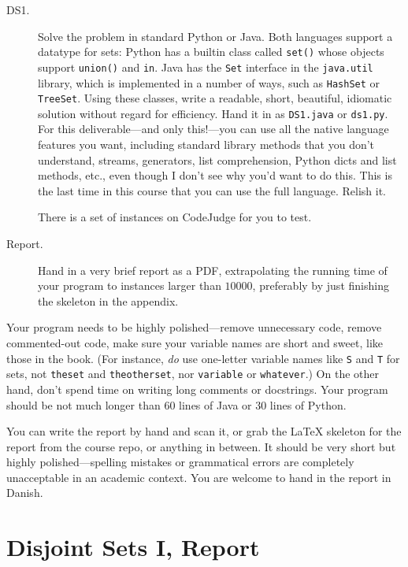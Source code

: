 \documentclass{tufte-handout}
\begin{document}
\begin{description}
  \item[DS1.]
    Solve the problem in standard Python or Java.
    Both languages support a datatype for sets:
    Python has a builtin class called \texttt{set()} whose objects support \texttt{union()} and \texttt{in}.
    Java has the \texttt{Set} interface in the \texttt{java.util} library, which is implemented in a number of ways, such as \texttt{HashSet} or \texttt{TreeSet}.
    Using these classes, write a readable, short, beautiful, idiomatic solution without regard for efficiency.
    Hand it in as \texttt{DS1.java} or \texttt{ds1.py}.
    For this deliverable---and only this!---you can use all the native language features you want, including standard library methods that you don't understand, streams, generators, list comprehension, Python dicts and list methods, etc., even though I don't see why you'd want to do this.
    This is the last time in this course that you can use the full language.
    Relish it.
    
    There is a set of instances on CodeJudge for you to test.
  \item[Report.]
    Hand in a very brief report as a PDF, extrapolating the running time of your program to instances larger than $10000$, preferably by just finishing the skeleton in the appendix. 
\end{description}

Your program needs to be highly polished---remove unnecessary code, remove commented-out code, make sure your variable names are short and sweet, like those in the book.
(For instance, \emph{do} use one-letter variable names like \texttt{S} and \texttt{T} for sets, not \texttt{theset} and \texttt{theotherset}, nor \texttt{variable} or \texttt{whatever}.)
On the other hand, don't spend time on writing long comments or docstrings.
Your program should be not much longer than 60 lines of Java or 30 lines of Python.


You can write the report by hand and scan it, or grab the LaTeX skeleton for the report from the course repo, or anything in between.
It should be very short but highly polished---spelling mistakes or grammatical errors are completely unacceptable in an academic context.
You are welcome to hand in the report in Danish.

\newpage
\section{Disjoint Sets I, Report}
\end{document}

